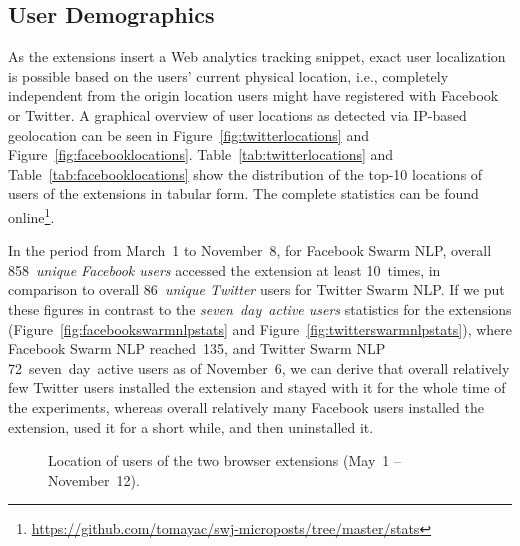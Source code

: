 \documentclass{iosart2c}
\begin{document}
\subsection{User Demographics}
As the extensions insert a Web analytics tracking snippet, exact user localization is possible based on the users' current physical location, i.e., completely independent from the origin location users might have registered with Facebook or Twitter.
A graphical overview of user locations as detected via IP-based geolocation can be seen in Figure~\autoref{fig:twitterlocations} and Figure~\autoref{fig:facebooklocations}.
Table~\autoref{tab:twitterlocations} and Table~\autoref{tab:facebooklocations} show the distribution of the top-10 locations of users of the extensions in tabular form. 
The complete statistics can be found online\footnote{\url{https://github.com/tomayac/swj-microposts/tree/master/stats}}.

In the period from March~1 to November~8, for Facebook Swarm NLP, overall 858~\emph{unique Facebook users} accessed the extension at least 10~times, in comparison to overall 86~\emph{unique Twitter} users for Twitter Swarm NLP.
If we put these figures in contrast to the \emph{seven~day~active users} statistics for the extensions (Figure~\autoref{fig:facebookswarmnlpstats} and Figure~\autoref{fig:twitterswarmnlpstats}), where Facebook Swarm NLP reached~135, and Twitter Swarm NLP 72~seven~day~active users as of November~6, we can derive that overall relatively few Twitter users installed the extension and stayed with it for the whole time of the experiments, whereas overall relatively many Facebook users installed the extension, used it for a short while, and then uninstalled it.

\begin{figure}
  \centering
    \qquad
\caption{Location of users of the two browser extensions (May~1 -- November~12).}
\label{fig:location}
\end{figure}
\end{document}
